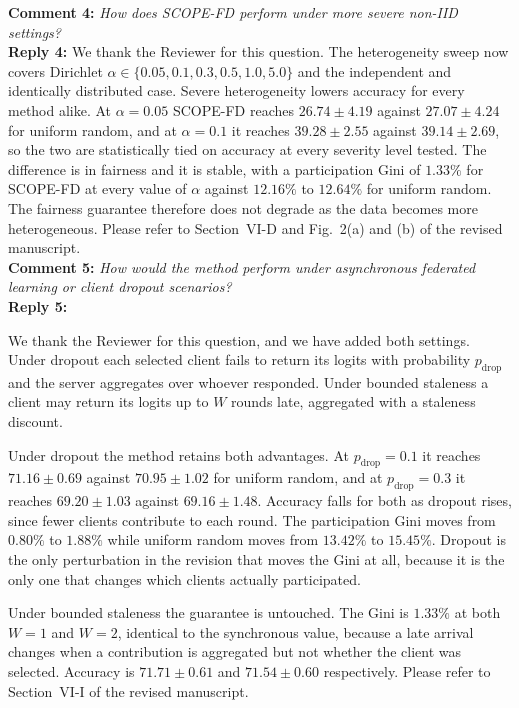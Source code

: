 \documentclass[10pt]{article}
\begin{document}
\noindent
\textbf{Comment 4:} \textit{How does SCOPE-FD perform under more severe non-IID settings?} \\
\noindent
\textbf{Reply 4:} {We thank the Reviewer for this question. The heterogeneity sweep now covers Dirichlet $\alpha \in \{0.05, 0.1, 0.3, 0.5, 1.0, 5.0\}$ and the independent and identically distributed case. Severe heterogeneity lowers accuracy for every method alike. At $\alpha = 0.05$ SCOPE-FD reaches $26.74 \pm 4.19$ against $27.07 \pm 4.24$ for uniform random, and at $\alpha = 0.1$ it reaches $39.28 \pm 2.55$ against $39.14 \pm 2.69$, so the two are statistically tied on accuracy at every severity level tested. The difference is in fairness and it is stable, with a participation Gini of $1.33\%$ for SCOPE-FD at every value of $\alpha$ against $12.16\%$ to $12.64\%$ for uniform random. The fairness guarantee therefore does not degrade as the data becomes more heterogeneous. Please refer to Section~VI-D and Fig.~2(a) and (b) of the revised manuscript.}\\

\noindent
\textbf{Comment 5:} \textit{How would the method perform under asynchronous federated learning or client dropout scenarios?} \\
\noindent
\textbf{Reply 5:} {We thank the Reviewer for this question, and we have added both settings. Under dropout each selected client fails to return its logits with probability $p_{\text{drop}}$ and the server aggregates over whoever responded. Under bounded staleness a client may return its logits up to $W$ rounds late, aggregated with a staleness discount.

Under dropout the method retains both advantages. At $p_{\text{drop}} = 0.1$ it reaches $71.16 \pm 0.69$ against $70.95 \pm 1.02$ for uniform random, and at $p_{\text{drop}} = 0.3$ it reaches $69.20 \pm 1.03$ against $69.16 \pm 1.48$. Accuracy falls for both as dropout rises, since fewer clients contribute to each round. The participation Gini moves from $0.80\%$ to $1.88\%$ while uniform random moves from $13.42\%$ to $15.45\%$. Dropout is the only perturbation in the revision that moves the Gini at all, because it is the only one that changes which clients actually participated.

Under bounded staleness the guarantee is untouched. The Gini is $1.33\%$ at both $W = 1$ and $W = 2$, identical to the synchronous value, because a late arrival changes when a contribution is aggregated but not whether the client was selected. Accuracy is $71.71 \pm 0.61$ and $71.54 \pm 0.60$ respectively. Please refer to Section~VI-I of the revised manuscript.}\\
\end{document}
